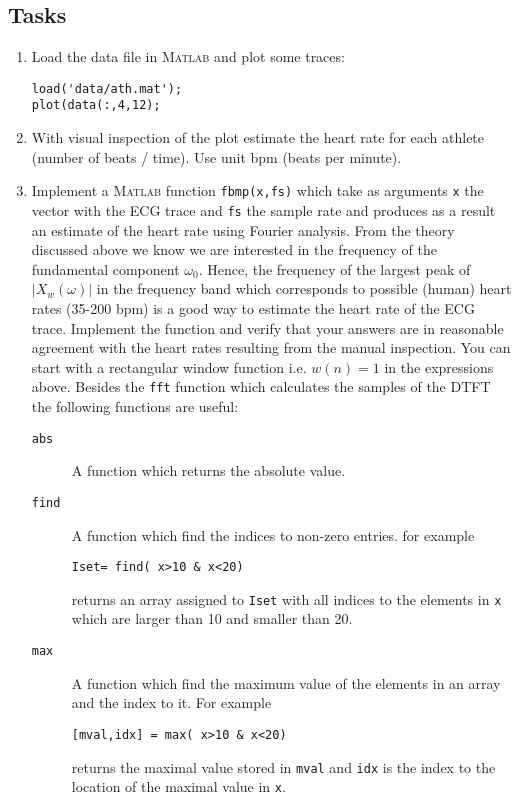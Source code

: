 \documentclass[12pt]{article}
\begin{document}
\subsection{Tasks}
\label{sec:tasks}
\begin{enumerate}
\item Load the data file in \textsc{Matlab} and plot some traces:
\begin{verbatim}
load('data/ath.mat');
plot(data(:,4,12); 
\end{verbatim}
\item With visual inspection of the plot estimate the heart rate for each athlete (number of beats / time). Use unit bpm (beats per minute).
\item Implement a \textsc{Matlab} function \texttt{fbmp(x,fs)} which take as arguments \texttt{x} the vector with the ECG trace and \texttt{fs} the sample rate and produces as a result an estimate of the heart rate using Fourier analysis. From the theory discussed above  we know we are interested in the frequency of the fundamental component $\omega_0$. Hence, the frequency of the largest peak of $|X_w(\omega)|$ in the frequency band which corresponds to possible (human) heart rates (35-200 bpm) is a good way to estimate the heart rate of the ECG trace. Implement the function and verify that your answers are in reasonable agreement with the heart rates resulting from the manual inspection.  You can start with a rectangular window function i.e. $w(n)=1$ in the expressions above.  Besides the \texttt{fft} function which calculates the samples of the DTFT  the following functions are useful:
  \begin{description}
  \item[\texttt{abs}] A function which returns the absolute value.
  \item[\texttt{find}] A function which find the indices to non-zero entries. for example
\begin{verbatim}
Iset= find( x>10 & x<20)
\end{verbatim}
returns an array assigned to \texttt{Iset} with all indices to the elements in \texttt{x} which are larger than 10 and smaller than 20. 
  \item[\texttt{max}] A function which find the maximum value of the elements in an array and the index to it. For example
\begin{verbatim}
[mval,idx] = max( x>10 & x<20)
\end{verbatim}
returns the maximal value stored in \texttt{mval} and \texttt{idx} is the index to the location of the maximal value in \texttt{x}. 

\end{description}
\end{enumerate}
\end{document}
